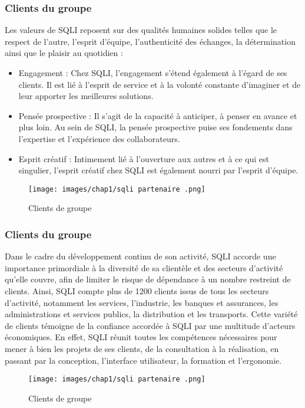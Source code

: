 \subsubsection{Clients du groupe}

\indent  Les valeurs de SQLI reposent sur des qualités humaines solides telles que le respect de l’autre, l’esprit d’équipe, l’authenticité des échanges, la détermination ainsi que le plaisir au quotidien :
\begin{itemize}
  \item Engagement : Chez SQLI, l’engagement s’étend également à l’égard de ses clients. Il est lié à l’esprit de service et à la volonté constante d’imaginer et de leur apporter les meilleures solutions.
  \item Pensée prospective : Il s'agit de la capacité à anticiper, à penser en avance et plus loin. Au sein de SQLI, la pensée prospective puise ses fondements dans l'expertise et l'expérience des collaborateurs.
  \item Esprit créatif : Intimement lié à l’ouverture aux autres et à ce qui est singulier, l’esprit créatif chez SQLI est également nourri par l’esprit d’équipe.
  \vspace{0.5cm}
\end{itemize}
\begin{figure}[H]  
  \centering  
  \texttt{[image: images/chap1/sqli partenaire .png]}
  \caption{Clients de groupe \cite{1}}
  \label{Logo SQLI}
\end{figure}

\subsubsection{Clients du groupe}

\indent  Dans le cadre du développement continu de son activité, SQLI accorde une importance primordiale à la diversité de sa clientèle et des secteurs d’activité qu’elle couvre, afin de limiter le risque de dépendance à un nombre restreint de clients. Ainsi, SQLI compte plus de 1200 clients issus de tous les secteurs d’activité, notamment les services, l’industrie, les banques et assurances, les administrations et services publics, la distribution et les transports. Cette variété de clients témoigne de la confiance accordée à SQLI par une multitude d'acteurs économiques. En effet, SQLI réunit toutes les compétences nécessaires pour mener à bien les projets de ses clients, de la consultation à la réalisation, en passant par la conception, l'interface utilisateur, la formation et l'ergonomie.
\begin{figure}[H]  
  \centering  
  \texttt{[image: images/chap1/sqli partenaire .png]}
  \caption{Clients de groupe \cite{1}}
  \label{Logo SQLI}
\end{figure}



